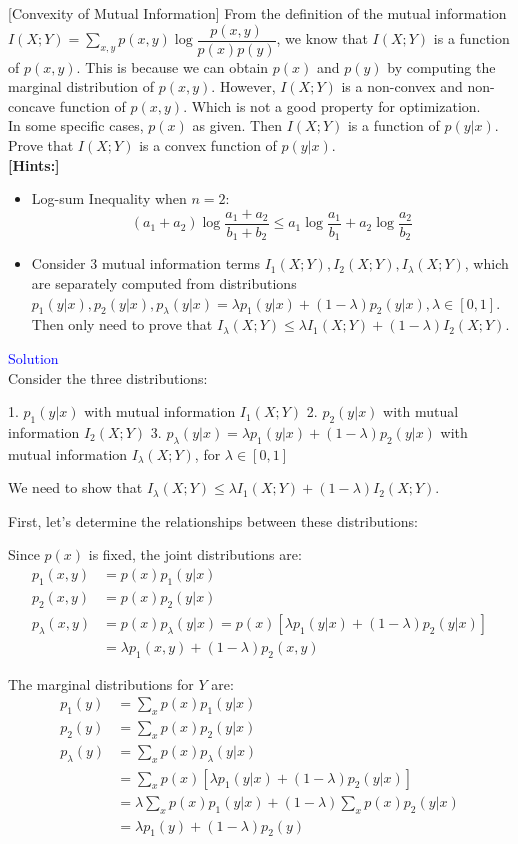 \item {} [Convexity of Mutual Information] From the definition of the mutual information $I(X;Y)=\sum\limits_{x,y}p(x,y)\log\dfrac{p(x,y)}{p(x)p(y)}$, we know that $I(X;Y)$ is a function of $p(x,y)$. This is because we can obtain $p(x)$ and $p(y)$ by computing the marginal distribution of $p(x,y)$. However, $I(X;Y)$ is a non-convex and non-concave function of $p(x,y)$. Which is not a good property for optimization. \\
In some specific cases, $p(x)$ as given. Then $I(X;Y)$ is a function of $p(y|x)$. Prove that $I(X;Y)$ is a convex function of $p(y|x)$. \\
\textbf{[Hints:]}
\begin{itemize}
\item Log-sum Inequality when $n=2$:
$$(a_1+a_2)\log\dfrac{a_1+a_2}{b_1+b_2}\leq a_1\log\dfrac{a_1}{b_1}+a_2\log\dfrac{a_2}{b_2}$$
\item Consider $3$ mutual information terms $I_1(X;Y), I_2(X;Y), I_{\lambda}(X;Y)$, which are separately computed from distributions $p_1(y|x), p_2(y|x), p_{\lambda}(y|x)=\lambda p_1(y|x)+(1-\lambda)p_2(y|x), \lambda\in[0,1]$. Then only need to prove that $I_{\lambda}(X;Y)\leq \lambda I_1(X;Y)+(1-\lambda)I_2(X;Y)$.
\end{itemize}

\textcolor{blue}{Solution} \\

Consider the three distributions:

1. $p_1(y|x)$ with mutual information $I_1(X;Y)$
2. $p_2(y|x)$ with mutual information $I_2(X;Y)$
3. $p_{\lambda}(y|x) = \lambda p_1(y|x) + (1-\lambda)p_2(y|x)$ with mutual information $I_{\lambda}(X;Y)$, for $\lambda \in [0,1]$

We need to show that $I_{\lambda}(X;Y) \leq \lambda I_1(X;Y) + (1-\lambda)I_2(X;Y)$.

First, let's determine the relationships between these distributions:

Since $p(x)$ is fixed, the joint distributions are:
\begin{align*}
p_1(x,y) &= p(x)p_1(y|x) \\
p_2(x,y) &= p(x)p_2(y|x) \\
p_{\lambda}(x,y) &= p(x)p_{\lambda}(y|x) = p(x)[\lambda p_1(y|x) + (1-\lambda)p_2(y|x)] \\
&= \lambda p_1(x,y) + (1-\lambda)p_2(x,y)
\end{align*}

The marginal distributions for $Y$ are:
\begin{align*}
p_1(y) &= \sum_x p(x)p_1(y|x) \\
p_2(y) &= \sum_x p(x)p_2(y|x) \\
p_{\lambda}(y) &= \sum_x p(x)p_{\lambda}(y|x) \\
&= \sum_x p(x)[\lambda p_1(y|x) + (1-\lambda)p_2(y|x)] \\
&= \lambda \sum_x p(x)p_1(y|x) + (1-\lambda) \sum_x p(x)p_2(y|x) \\
&= \lambda p_1(y) + (1-\lambda)p_2(y)
\end{align*}

